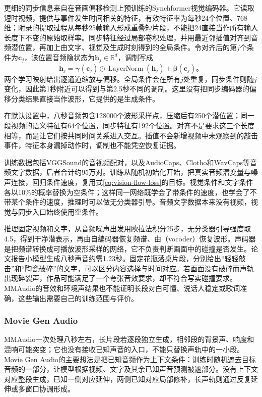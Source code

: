 更细的同步信息来自在音画偏移检测上预训练的Synchformer视觉编码器。它读取短时视频，提供与事件发生时间相关的特征，有效特征率为每秒24个位置、768维；附录的提取过程从每秒25帧输入形成重叠短片段，不能把24直接当作所有输入长度下不变的原始取样率。同步特征经过局部卷积处理，并用最近邻插值对齐到音频潜位置，再加上由文字、视觉及生成时刻得到的全局条件。令对齐后的第$j$个条件为$\bm c_j$，该位置音频隐状态为$\bm h_j\in\mathbb R^d$，调制写成
\begin{equation}
  \widetilde{\bm h}_j
  =\bm\gamma(\bm c_j)\odot
     \operatorname{LayerNorm}(\bm h_j)
    +\bm\beta(\bm c_j)\text{。}
  \label{eq:vision-audio-sync-modulation}
\end{equation}
两个学习映射给出逐通道缩放与偏移。全局条件会在所有$j$处重复，同步条件则随$j$变化，因此第1秒附近可以得到与第2.5秒不同的调制。这里没有把同步编码器的偏移分类结果直接当作波形，它提供的是生成条件。

在默认设置中，八秒音频包含128000个波形采样点，压缩后有250个潜位置；同一段视频的语义特征有64个位置，同步特征有192个位置。对齐不是要求这三个长度相等，而是让它们按共同时间关系进入交互。插值不会新增视频中未观察到的敲击事件，特征本身漏掉动作时，调制也不能凭空恢复证据。

训练数据包括VGGSound的音视频配对，以及AudioCaps、Clotho和WavCaps等音频文字数据，后者合计约95万对。训练从随机初始化开始，把真实音频潜变量与噪声连接，回归条件速度，复用式\eqref{eq:vision-flow-loss}的目标。视觉条件和文字条件各以10\%的概率替换为空条件；这样同一网络既学会了带条件的速度，也学会了不带某个条件的速度，推理时可以做无分类器引导。音频文字数据本来没有视频，视觉与同步入口始终使用空条件。

推理固定视频和文字，从音频噪声出发用欧拉法积分25步，无分类器引导强度取4.5，得到干净潜表示，再由自编码器恢复频谱、由（vocoder）恢复波形。声码器是把频谱转换成可播放波形采样的网络，它不负责判断画面中的碰撞是否发生。论文报告小模型生成八秒声音约需1.23秒。固定花瓶落桌片段，分别给出“轻轻敲击”和“陶瓷破碎”的文字，可以区分内容选择与时间对应。若画面没有破碎而声轨出现碎裂声，作品可能满足了一个夸张音效要求，却不符合写实碰撞要求。MMAudio的音效和环境声结果也不能证明长段对白可懂、说话人稳定或歌词准确，这些输出需要自己的训练范围与评价。

\subsubsection{Movie Gen Audio}
\label{sec:vision-multigen-movie-audio}

MMAudio一次处理八秒左右，长片段若逐段独立生成，相邻段的背景声、响度和混响可能突变；它也没有接收已知声音的入口，不能只替换声轨中的一小段。Movie Gen Audio的主要想法是把已知音频作为上下文条件：训练时随机遮去目标音频的一部分，让模型根据视频、文字及其余已知声音预测被遮部分。没有上下文对应整段生成，已知一侧对应延伸，两侧已知对应局部修补，长声轨则通过反复延伸或多窗口协调形成。

